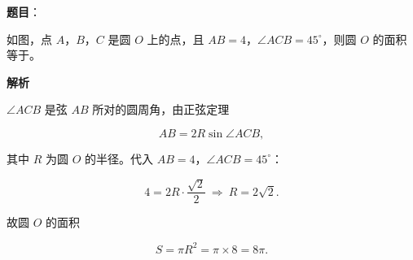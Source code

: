 \begin{answer}

\textbf{题目}：

如图，点 $A$，$B$，$C$ 是圆 $O$ 上的点，且 $AB=4$，$\angle ACB=45^\circ$，则圆 $O$ 的面积等于\gkblank{}。
\nopagebreak[4]
\begin{center}\end{center}
\nopagebreak[4]
\textbf{解析}

$\angle ACB$ 是弦 $AB$ 所对的圆周角，由正弦定理

\nopagebreak[4]
\[AB=2R\sin\angle ACB,\]

其中 $R$ 为圆 $O$ 的半径。代入 $AB=4$，$\angle ACB=45^\circ$：

\nopagebreak[4]
\[4=2R\cdot\frac{\sqrt2}{2}\ \Longrightarrow\ R=2\sqrt2.\]

故圆 $O$ 的面积

\nopagebreak[4]
\[S=\pi R^2=\pi\times8=8\pi.\]


\end{answer}

